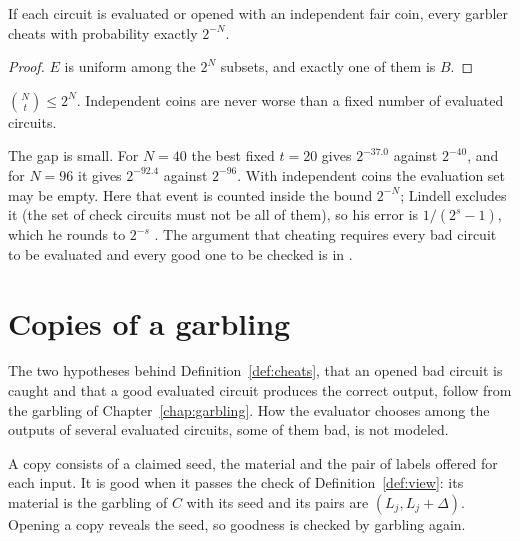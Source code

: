\begin{theorem}
  \label{thm:cc-lindell}
  \leanok
  If each circuit is evaluated or opened with an independent fair coin, every garbler cheats with
  probability exactly $2^{-N}$.
\end{theorem}

\begin{proof}
  \leanok
  $E$ is uniform among the $2^N$ subsets, and exactly one of them is $B$.
\end{proof}

\begin{proposition}
  \label{prop:choose-le}
  \leanok
  $\binom{N}{t} \le 2^N$. Independent coins are never worse than a fixed number of evaluated
  circuits.
\end{proposition}

\begin{remark}
  The gap is small. For $N = 40$ the best fixed $t = 20$ gives $2^{-37.0}$ against $2^{-40}$, and
  for $N = 96$ it gives $2^{-92.4}$ against $2^{-96}$. With independent coins the evaluation set
  may be empty. Here that event is counted inside the bound $2^{-N}$; Lindell excludes it (the set
  of check circuits must not be all of them), so his error is $1/(2^{s} - 1)$, which he rounds to
  $2^{-s}$ \cite[Theorem~4.1 and its footnote~3]{Lin13}. The argument that cheating
  requires every bad circuit to be evaluated and every good one to be checked is in
  \cite[Sect.~2]{Lin13}.
\end{remark}

\section{Copies of a garbling}

The two hypotheses behind Definition~\ref{def:cheats}, that an opened bad circuit is caught and that
a good evaluated circuit produces the correct output, follow from the garbling of
Chapter~\ref{chap:garbling}. How the evaluator chooses among the outputs of several evaluated
circuits, some of them bad, is not modeled.

\begin{definition}[Copies]
  \label{def:copies}
  \leanok
  A copy consists of a claimed seed, the material and the pair of labels offered for each input.
  It is good when it passes the check of Definition~\ref{def:view}: its material is the garbling
  of $C$ with its seed and its pairs are $(L_j, L_j + \Delta)$. Opening a copy reveals the seed,
  so goodness is checked by garbling again.
\end{definition}

